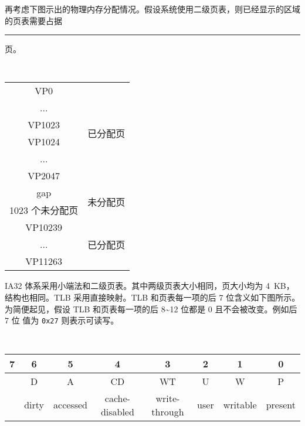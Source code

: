 \begin{problems}
        再考虑下图示出的物理内存分配情况。假设系统使用二级页表，则已经显示的区域的页表需要占据 \rule{2.5cm}{0.25mm} 页。
        \begin{table}[H]
            \tt
            \centering
            \begin{tabular}{|c|c|}
                \hline
                {\quad VP0 \quad} & \multirow{6}{*}{\quad 已分配页 \quad} \\ \cline{1-1}
                ... &  \\ \cline{1-1}
                VP1023 &  \\ \cline{1-1}
                VP1024 &  \\ \cline{1-1}
                ... &  \\ \cline{1-1}
                VP2047 &  \\ \hline
                \multirow{2}{*}{gap} & \multirow{4}{*}{未分配页} \\
                &  \\ \cline{1-1}
                \multirow{2}{*}{1023 个未分配页} &  \\
                &  \\ \hline
                VP10239 & \multirow{4}{*}{已分配页} \\ \cline{1-1}
                ... &  \\ \cline{1-1}
                VP11263 &  \\ \hline
                \end{tabular}
        \end{table}
        \qn IA32 体系采用小端法和二级页表。其中两级页表大小相同，页大小均为 \SI{4}{KB}，结构也相同。TLB 采用直接映射。TLB 和页表每一项的后 7 位含义如下图所示。为简便起见，假设 TLB 和页表每一项的后 8\textasciitilde 12 位都是 0 且不会被改变。例如后 7 位 值为 \verb|0x27| 则表示可读写。
        \begin{table}[H]
            \tt
            \centering
            \begin{tabular}{cccccccc}
                {\footnotesize 7} & {\footnotesize 6} & {\footnotesize 5} & {\footnotesize 4} & {\footnotesize 3} & {\footnotesize 2} & {\footnotesize 1} & {\footnotesize 0} \\ \hline
                \multicolumn{1}{|c|}{\cellcolor{gray!50}} & \multicolumn{1}{c|}{D} & \multicolumn{1}{c|}{A} & \multicolumn{1}{c|}{CD} & \multicolumn{1}{c|}{WT} & \multicolumn{1}{c|}{U} & \multicolumn{1}{c|}{W} & \multicolumn{1}{c|}{P} \\ \hline
                & {\footnotesize dirty} & {\footnotesize accessed} & {\footnotesize cache-disabled} & {\footnotesize write-through} & {\footnotesize user} & {\footnotesize writable} & {\footnotesize present}

\end{tabular}
\end{table}
\end{problems}
